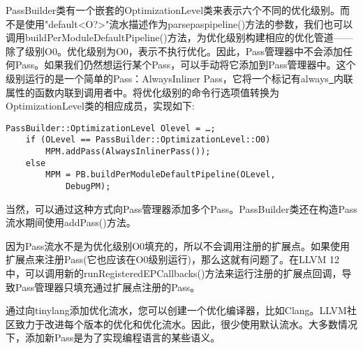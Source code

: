 \begin{enumerate}
PassBuilder类有一个嵌套的OptimizationLevel类来表示六个不同的优化级别。而不是使用"default<O?>"流水描述作为parsepaspipeline()方法的参数，我们也可以调用buildPer\allowbreak ModuleDefaultPipeline()方法，为优化级别构建相应的优化管道——除了级别O0。优化级别为O0，表示不执行优化。因此，Pass管理器中不会添加任何Pass。如果我们仍然想运行某个Pass，可以手动将它添加到Pass管理器中。这个级别运行的是一个简单的Pass：AlwaysInliner Pass，它将一个标记有always\underline{~}内联属性的函数内联到调用者中。将优化级别的命令行选项值转换为OptimizationLevel类的相应成员，实现如下:
\begin{lstlisting}[caption={}]
	PassBuilder::OptimizationLevel Olevel = …;
	if (OLevel == PassBuilder::OptimizationLevel::O0)
		MPM.addPass(AlwaysInlinerPass());
	else
		MPM = PB.buildPerModuleDefaultPipeline(OLevel, 
			DebugPM);
\end{lstlisting}

当然，可以通过这种方式向Pass管理器添加多个Pass。PassBuilder类还在构造Pass流水期间使用addPass()方法。\par

\begin{tcolorbox}[colback=blue!5!white,colframe=mymauve!75!black, title=LLVM 12中的新功能——运行扩展点回调]
因为Pass流水不是为优化级别O0填充的，所以不会调用注册的扩展点。如果使用扩展点来注册Pass(它也应该在O0级别运行)，那么这就有问题了。在LLVM 12中，可以调用新的runRegisteredEPCallbacks()方法来运行注册的扩展点回调，导致Pass管理器只填充通过扩展点注册的Pass。
\end{tcolorbox}

\end{enumerate}

通过向tinylang添加优化流水，您可以创建一个优化编译器，比如Clang。LLVM社区致力于改进每个版本的优化和优化流水。因此，很少使用默认流水。大多数情况下，添加新Pass是为了实现编程语言的某些语义。\par




